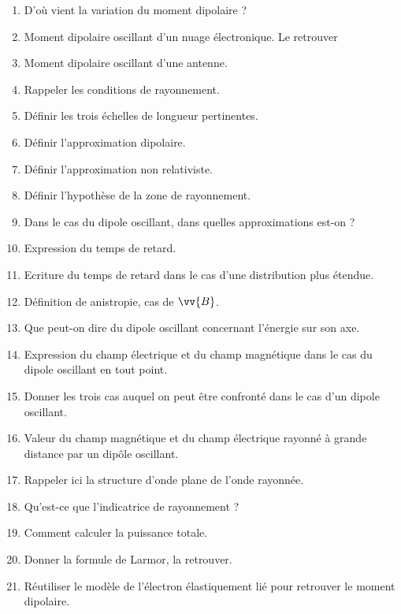 \documentclass[a4paper, 11pt, hidelinks]{article}
\begin{document}
\begin{enumerate}
    \item D'où vient la variation du moment dipolaire ? \cite{Chapitre18}
    \item Moment dipolaire oscillant d'un nuage électronique. Le retrouver \cite{Chapitre18}
    \item Moment dipolaire oscillant d'une antenne. \cite{Chapitre18}
    \item Rappeler les conditions de rayonnement. \cite{Chapitre18}
    \item Définir les trois échelles de longueur pertinentes. \cite{Chapitre18}
    \item Définir l'approximation dipolaire. \cite{Chapitre18}
    \item Définir l'approximation non relativiste. \cite{Chapitre18}
    \item Définir l'hypothèse de la zone de rayonnement. \cite{Chapitre18}
    \item Dans le cas du dipole oscillant, dans quelles approximations est-on ? \cite{Chapitre18}
    \item Expression du temps de retard. \cite{Chapitre18}
    \item Ecriture du temps de retard dans le cas d'une distribution plus étendue. \cite{Chapitre18}
    \item Définition de anistropie, cas de $\vv{B}$. \cite{Chapitre18}
    \item Que peut-on dire du dipole oscillant concernant l'énergie sur son axe. \cite{Chapitre18}
    \item Expression du champ électrique et du champ magnétique dans le cas du dipole oscillant en tout point. \cite{Chapitre18}
    \item Donner les trois cas auquel on peut être confronté dans le cas d'un dipole oscillant. \cite{Chapitre18}
    \item Valeur du champ magnétique et du champ électrique rayonné à grande distance par un dipôle oscillant. \cite{Chapitre18}
    \item Rappeler ici la structure d'onde plane de l'onde rayonnée. \cite{Chapitre18}
    \item Qu'est-ce que l'indicatrice de rayonnement ? \cite{Chapitre18}
    \item Comment calculer la puissance totale. \cite{Chapitre18}
    \item Donner la formule de Larmor, la retrouver. \cite{Chapitre18}
    \item Réutiliser le modèle de l'électron élastiquement lié pour retrouver le moment dipolaire. \cite{Chapitre18}

\end{enumerate}
\end{document}
